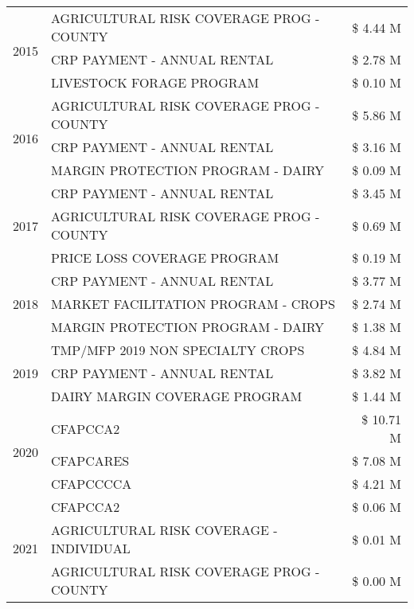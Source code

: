 \begin{tabular}{llr}
\cline{1-3}
\multirow[t]{3}{*}{2015} & AGRICULTURAL RISK COVERAGE PROG - COUNTY & \$ 4.44 M \\
 & CRP PAYMENT - ANNUAL RENTAL & \$ 2.78 M \\
 & LIVESTOCK FORAGE PROGRAM & \$ 0.10 M \\
\cline{1-3}
\multirow[t]{3}{*}{2016} & AGRICULTURAL RISK COVERAGE PROG - COUNTY & \$ 5.86 M \\
 & CRP PAYMENT - ANNUAL RENTAL & \$ 3.16 M \\
 & MARGIN PROTECTION PROGRAM - DAIRY & \$ 0.09 M \\
\cline{1-3}
\multirow[t]{3}{*}{2017} & CRP PAYMENT - ANNUAL RENTAL & \$ 3.45 M \\
 & AGRICULTURAL RISK COVERAGE PROG - COUNTY & \$ 0.69 M \\
 & PRICE LOSS COVERAGE PROGRAM & \$ 0.19 M \\
\cline{1-3}
\multirow[t]{3}{*}{2018} & CRP PAYMENT - ANNUAL RENTAL & \$ 3.77 M \\
 & MARKET FACILITATION PROGRAM - CROPS & \$ 2.74 M \\
 & MARGIN PROTECTION PROGRAM - DAIRY & \$ 1.38 M \\
\cline{1-3}
\multirow[t]{3}{*}{2019} & TMP/MFP 2019 NON SPECIALTY CROPS & \$ 4.84 M \\
 & CRP PAYMENT - ANNUAL RENTAL & \$ 3.82 M \\
 & DAIRY MARGIN COVERAGE PROGRAM & \$ 1.44 M \\
\cline{1-3}
\multirow[t]{3}{*}{2020} & CFAPCCA2 & \$ 10.71 M \\
 & CFAPCARES & \$ 7.08 M \\
 & CFAPCCCCA & \$ 4.21 M \\
\cline{1-3}
\multirow[t]{3}{*}{2021} & CFAPCCA2 & \$ 0.06 M \\
 & AGRICULTURAL RISK COVERAGE - INDIVIDUAL & \$ 0.01 M \\
 & AGRICULTURAL RISK COVERAGE PROG - COUNTY & \$ 0.00 M \\
\cline{1-3}
\bottomrule
\end{tabular}
